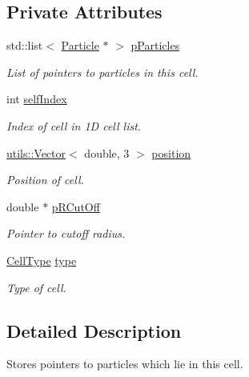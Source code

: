\subsection*{Private Attributes}
\begin{DoxyCompactItemize}
\item 
std\-::list$<$ \hyperlink{classSimulation_1_1Particle}{Particle} $\ast$ $>$ \hyperlink{classSimulation_1_1ParticleCell_adba57fd356e5966d87c181713cf9ca28}{p\-Particles}
\begin{DoxyCompactList}\small\item\em List of pointers to particles in this cell. \end{DoxyCompactList}\item 
int \hyperlink{classSimulation_1_1ParticleCell_a9c834e02eef34d364fafd837776bbf23}{self\-Index}
\begin{DoxyCompactList}\small\item\em Index of cell in 1\-D cell list. \end{DoxyCompactList}\item 
\hyperlink{classutils_1_1Vector}{utils\-::\-Vector}$<$ double, 3 $>$ \hyperlink{classSimulation_1_1ParticleCell_af518d59e9d7b1839e7c69de47d73fc09}{position}
\begin{DoxyCompactList}\small\item\em Position of cell. \end{DoxyCompactList}\item 
double $\ast$ \hyperlink{classSimulation_1_1ParticleCell_a5daab4af3ab096dfd7b2de63125ff8b5}{p\-R\-Cut\-Off}
\begin{DoxyCompactList}\small\item\em Pointer to cutoff radius. \end{DoxyCompactList}\item 
\hyperlink{classSimulation_1_1ParticleCell_a2212779392dcf6befecc55da1ec5356c}{Cell\-Type} \hyperlink{classSimulation_1_1ParticleCell_a4b86c6d459e7cf660b0ff4dbb9796348}{type}
\begin{DoxyCompactList}\small\item\em Type of cell. \end{DoxyCompactList}\end{DoxyCompactItemize}


\subsection{Detailed Description}
Stores pointers to particles which lie in this cell. 

